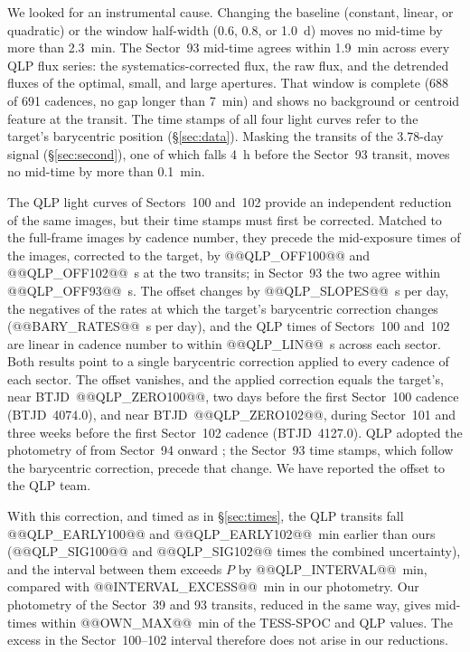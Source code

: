 \documentclass[twocolumn,linenumbers]{aastex701}
\begin{document}
We looked for an instrumental cause. Changing the baseline (constant, linear, or quadratic) or the window half-width (0.6, 0.8, or 1.0~d) moves no mid-time by more than 2.3~min. The Sector~93 mid-time agrees within 1.9~min across every QLP flux series: the systematics-corrected flux, the raw flux, and the detrended fluxes of the optimal, small, and large apertures. That window is complete (688 of 691 cadences, no gap longer than 7~min) and shows no background or centroid feature at the transit. The time stamps of all four light curves refer to the target's barycentric position (\S\ref{sec:data}). Masking the transits of the 3.78-day signal (\S\ref{sec:second}), one of which falls 4~h before the Sector~93 transit, moves no mid-time by more than 0.1~min.

The QLP light curves of Sectors~100 and~102 provide an independent reduction of the same images, but their time stamps must first be corrected. Matched to the full-frame images by cadence number, they precede the mid-exposure times of the images, corrected to the target, by @@QLP_OFF100@@ and @@QLP_OFF102@@~s at the two transits; in Sector~93 the two agree within @@QLP_OFF93@@~s. The offset changes by @@QLP_SLOPES@@~s per day, the negatives of the rates at which the target's barycentric correction changes (@@BARY_RATES@@~s per day), and the QLP times of Sectors~100 and~102 are linear in cadence number to within @@QLP_LIN@@~s across each sector. Both results point to a single barycentric correction applied to every cadence of each sector. The offset vanishes, and the applied correction equals the target's, near BTJD~@@QLP_ZERO100@@, two days before the first Sector~100 cadence (BTJD~4074.0), and near BTJD~@@QLP_ZERO102@@, during Sector~101 and three weeks before the first Sector~102 cadence (BTJD~4127.0). QLP adopted the photometry of \citet{Han2023} from Sector~94 onward \citep{Petitpas2026}; the Sector~93 time stamps, which follow the barycentric correction, precede that change. We have reported the offset to the QLP team.

With this correction, and timed as in \S\ref{sec:times}, the QLP transits fall @@QLP_EARLY100@@ and @@QLP_EARLY102@@~min earlier than ours (@@QLP_SIG100@@ and @@QLP_SIG102@@ times the combined uncertainty), and the interval between them exceeds $P$ by @@QLP_INTERVAL@@~min, compared with @@INTERVAL_EXCESS@@~min in our photometry. Our photometry of the Sector~39 and 93 transits, reduced in the same way, gives mid-times within @@OWN_MAX@@~min of the TESS-SPOC and QLP values. The excess in the Sector~100--102 interval therefore does not arise in our reductions.
\end{document}

